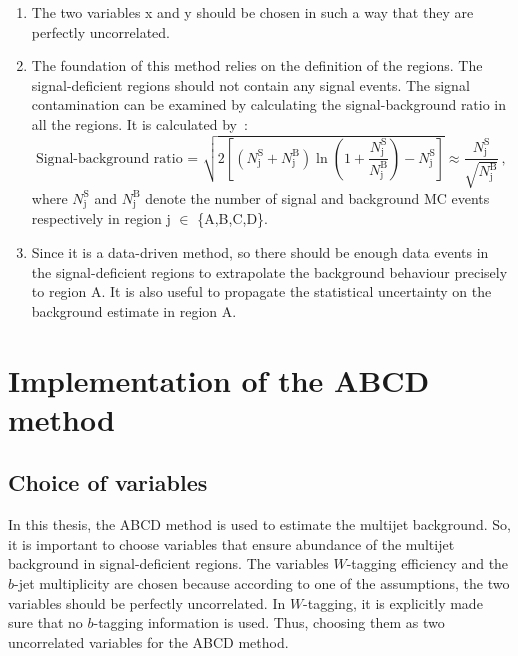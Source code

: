 \begin{enumerate}
	\item The two variables x and y should be chosen in such a way that they are perfectly uncorrelated.
	
	\item The foundation of this method relies on the definition of the regions. The signal-deficient regions should not contain any signal events. The signal contamination can be examined by calculating the signal-background ratio in all the regions. It is calculated by~\cite{signalbackgroundratio}: 
	\begin{equation}
		\text{Signal-background ratio = } \sqrt{2\left[(N_{\text{j}}^{\text{S}}+N_{\text{j}}^{\text{B}})\ln(1+\frac{N_{\text{j}}^{\text{S}}}{N_{\text{j}}^{\text{B}}})-N_{\text{j}}^{\text{S}}\right]} \approx \frac{N_{\text{j}}^{\text{S}}} {\sqrt{N_{\text{j}}^{\text{B}}}} \,,
		\label{eqn:abcd:sbratio}
	\end{equation}
	 where $N_{\text{j}}^{\text{S}}$ and $N_{\text{j}}^{\text{B}}$ denote the number of signal and background MC events respectively in region j $\in$ \{A,B,C,D\}.
	
	\item Since it is a data-driven method, so there should be enough data events in the signal-deficient regions to extrapolate the background behaviour precisely to region A. It is also useful to propagate the statistical uncertainty on the background estimate in region A.
	
\end{enumerate}


\section{Implementation of the ABCD method}
\label{sec:abcd:implementation}

\subsection{Choice of variables}
\label{sec:abcd:implementation:variables}
In this thesis, the ABCD method is used to estimate the multijet background. So, it is important to choose variables that ensure abundance of the multijet background in signal-deficient regions. The variables $W$-tagging efficiency and the $b$-jet multiplicity are chosen because according to one of the assumptions, the two variables should be perfectly uncorrelated. In $W$-tagging, it is explicitly made sure that no $b$-tagging information is used. Thus, choosing them as two uncorrelated variables for the ABCD method. 

